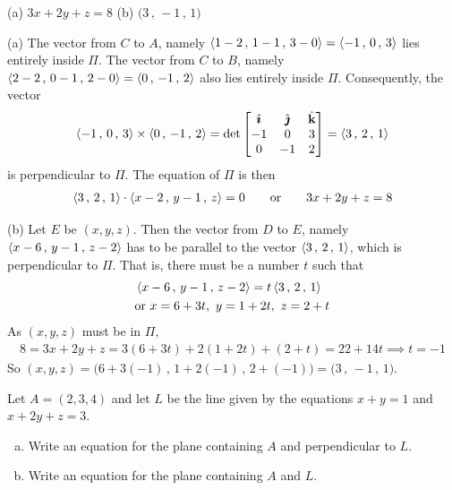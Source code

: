 %

\begin{answer}
(a) $3x+2y+z = 8$\qquad
(b) $\big(3\,,\,-1\,,\,1\big)$
\end{answer}

\begin{solution}
(a)
The vector from $C$ to $A$, namely 
 $\left< 1-2\,,\,1-1\,,\,3-0\right> = \left< -1\,,\,0\,,\,3\right>$ lies entirely inside 
$\Pi$. 
The vector from $C$ to $B$, namely 
 $\left< 2-2\,,\,0-1\,,\,2-0\right> = \left< 0\,,\,-1\,,\,2\right>$ also
lies entirely inside  $\Pi$.  Consequently, the vector
\begin{align*}
\left< -1\,,\,0\,,\,3\right>\times \left< 0\,,\,-1\,,\,2\right>
=\det\left[\begin{matrix}
            \hat{\pmb{\imath}}  &  \hat{\pmb{\jmath}}  &  \hat{\mathbf{k}} \\
            -1    &  0   &    3 \\
            0    &   -1   &    2 
            \end{matrix}\right]
=\left< 3 \,,\, 2 \,,\, 1 \right>
\end{align*}
is perpendicular to $\Pi$. The equation of $\Pi$ is then
\begin{align*}
\left< 3 \,,\, 2 \,,\, 1 \right> \cdot \left< x-2 \,,\, y-1 \,,\, z \right> = 0
\qquad\text{or}\qquad
3x+2y+z = 8
\end{align*}

(b) Let $E$ be $(x,y,z)$. Then the vector from $D$ to $E$,
namely $\left< x-6\,,\,y-1\,,\,z-2\right>$ has to be parallel to
the vector $\left< 3 \,,\, 2 \,,\, 1 \right>$, which is perpendicular to
$\Pi$. That is, there must be a number $t$ such that
\begin{align*}
& \left< x-6\,,\,y-1\,,\,z-2\right> = t \left< 3 \,,\, 2 \,,\, 1 \right> \\
&\text{or }x=6+3t,\ y=1+2t,\ z=2+t
\end{align*}
As $(x,y,z)$ must be in $\Pi$,
\begin{align*}
8 = 3x+2y+z = 3(6+3t) + 2(1+2t) +(2+t) = 22 +14 t
\implies t=-1
\end{align*}
So $(x,y,z) = \big(6+3(-1)\,,\,1+2(-1)\,,\,2+(-1)\big)
            = \big(3\,,\,-1\,,\,1\big)$.
\end{solution}

\begin{question}[M200 2011A] %
Let $A = (2, 3, 4)$ and let $L$ be the line given by the equations $x + y = 1$ and
$x + 2y + z = 3$.
\begin{enumerate}[(a)]
\item
Write an equation for the plane containing $A$ and perpendicular to $L$.
\item
Write an equation for the plane containing $A$ and $L$.
\end{enumerate}
\end{question}

